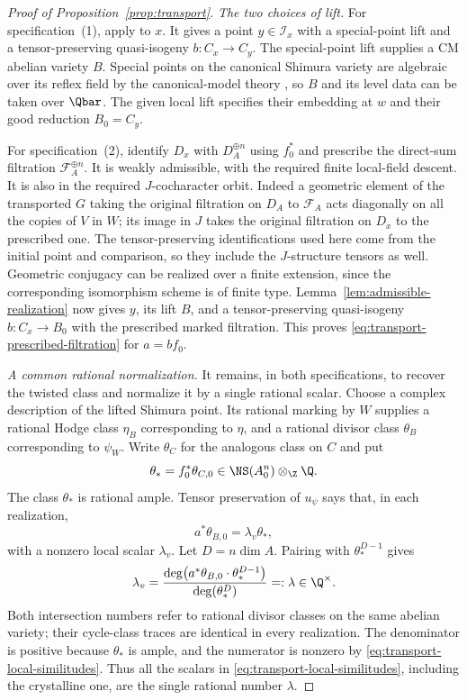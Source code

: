 \begin{proof}[Proof of Proposition~\ref{prop:transport}]
\medskip\noindent
\emph{The two choices of lift.}
For specification~(1), apply
\cite[Theorem~2.2.7]{KisinZhou2025} to $x$.  It gives a point
$y\in\mathcal I_x$ with a special-point lift and a
tensor-preserving quasi-isogeny $b:C_x\to C_y$.
The special-point lift supplies a CM abelian variety $B$.  Special
points on the canonical Shimura variety are algebraic over its
reflex field by the canonical-model theory
\cite[Definition~12.8 and Proposition~14.14]{MilneShimura}, so $B$
and its level data can be taken over $\Qbar$.  The given local lift specifies their embedding at $w$
and their good reduction $B_0=C_y$.

For specification~(2), identify $D_x$ with $D_A^{\oplus n}$ using
$f_0^*$ and prescribe the direct-sum filtration
$\mathcal F_A^{\oplus n}$.  It is weakly admissible, with the
required finite local-field descent.  It is also in the required
$J$-cocharacter orbit.  Indeed a geometric element of the
transported $G$ taking the original filtration on $D_A$ to
$\mathcal F_A$ acts diagonally on all the copies of $V$ in $W$;
its image in $J$ takes the original filtration on $D_x$ to the
prescribed one.  The tensor-preserving identifications used here
come from the initial point and comparison, so they include the
$J$-structure tensors as well.  Geometric conjugacy can be
realized over a finite extension, since the corresponding
isomorphism scheme is of finite type.
Lemma~\ref{lem:admissible-realization} now gives $y$, its lift
$B$, and a tensor-preserving quasi-isogeny $b:C_x\to B_0$ with
the prescribed marked filtration.  This proves
\eqref{eq:transport-prescribed-filtration} for
$a=bf_0$.

\medskip\noindent
\emph{A common rational normalization.}
It remains, in both specifications, to recover the twisted class
and normalize it by a single rational scalar.  Choose a complex
description of the lifted Shimura point.  Its rational marking by
$W$ supplies a rational Hodge class $\eta_B$ corresponding to
$\eta$, and a rational divisor class $\theta_B$
corresponding to $\psi_W$.  Write $\theta_C$ for the analogous
class on $C$ and put
\[
 \theta_*=f_0^*\theta_{C,0}\in\NS(A_0^n)\otimes_\Z\Q.
\]
The class $\theta_*$ is rational ample.  Tensor preservation of
$u_\psi$ says that, in each realization,
\begin{equation}
 a^*\theta_{B,0}=\lambda_v\theta_*,
 \label{eq:transport-local-similitudes}
\end{equation}
with a nonzero local scalar $\lambda_v$.  Let $D=n\dim A$.
Pairing with $\theta_*^{D-1}$ gives
\begin{equation}
 \lambda_v=
 \frac{\deg\bigl(a^*\theta_{B,0}\cdot\theta_*^{D-1}\bigr)}
      {\deg(\theta_*^D)}=:\lambda\in\Q^\times.
 \label{eq:transport-rational-similitude}
\end{equation}
Both intersection numbers refer to rational divisor classes on
the same abelian variety; their cycle-class traces are identical
in every realization.  The denominator is positive because
$\theta_*$ is ample, and the numerator is nonzero by
\eqref{eq:transport-local-similitudes}.  Thus all the scalars in
\eqref{eq:transport-local-similitudes}, including the crystalline
one, are the single rational number $\lambda$.


\end{proof}
